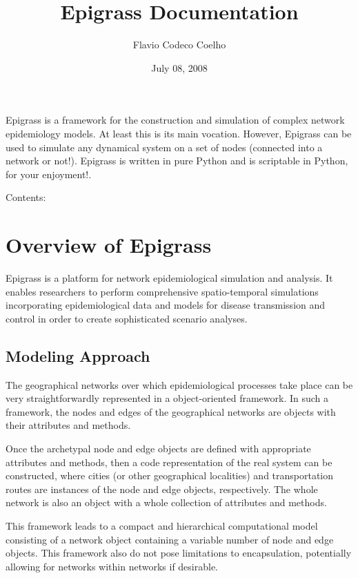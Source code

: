 \documentclass[a4paper,10pt]{manual}
\title{Epigrass Documentation}
\date{July 08, 2008}
\author{Flavio Codeco Coelho}
\begin{document}
\maketitle
\tableofcontents



Epigrass is a framework for the construction and simulation of complex network epidemiology models. At least this is its main vocation. However, Epigrass can be used to simulate any dynamical system on a set of nodes (connected into a network or not!). Epigrass is written in pure Python and is scriptable in Python, for your enjoyment!.

Contents:

\resetcurrentobjects


\chapter{Overview of Epigrass}

Epigrass is a platform for network epidemiological simulation and analysis. It enables researchers to perform comprehensive spatio-temporal simulations incorporating epidemiological data and models for disease transmission and control in order to create sophisticated scenario analyses.


\section{Modeling Approach}

The geographical networks  over which epidemiological processes take place can be very straightforwardly represented in a object-oriented framework. In such a framework, the nodes and edges of the geographical networks are objects with their attributes and methods.

Once the archetypal node and edge objects are defined with appropriate attributes and methods, then a code representation of the real system can be constructed, where cities (or other geographical localities) and transportation routes are instances of the node and edge objects, respectively. The whole network is also an object with a whole collection of attributes and methods.

This framework leads to a compact and hierarchical computational model consisting of a network object containing a variable number of node and edge objects. This framework also do not pose limitations to encapsulation, potentially allowing for networks within networks if desirable.
\end{document}
